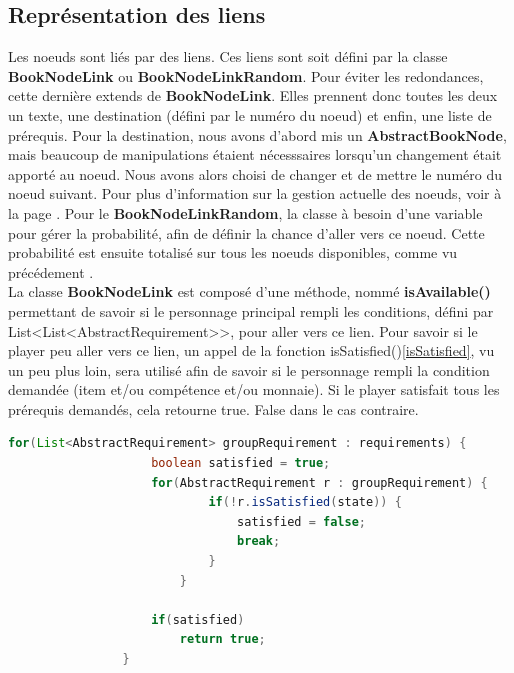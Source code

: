 		\subsection{Représentation des liens}
			Les noeuds sont liés par des liens. Ces liens sont soit défini par la classe \textbf{BookNodeLink} ou \textbf{BookNodeLinkRandom}. Pour éviter les redondances, cette dernière extends de \textbf{BookNodeLink}. Elles prennent donc toutes les deux un texte, une destination (défini par le numéro du noeud) et enfin, une liste de prérequis.  Pour la destination, nous avons d'abord mis un \textbf{AbstractBookNode}, mais beaucoup de manipulations étaient nécesssaires lorsqu'un changement était apporté au noeud. Nous avons alors choisi de changer et de mettre le numéro du noeud suivant. Pour plus d'information sur la gestion actuelle des noeuds, voir  à la page \pageref{book}.
			Pour le \textbf{BookNodeLinkRandom}, la classe à besoin d'une variable pour gérer la probabilité, afin de définir la chance d'aller vers ce noeud. Cette probabilité est ensuite totalisé sur tous les noeuds disponibles, comme vu précédement .\\
			La classe \textbf{BookNodeLink} est composé d'une méthode, nommé \textbf{isAvailable()} permettant de savoir si le personnage principal rempli les conditions, défini par List<List<AbstractRequirement>>, pour aller vers ce lien. Pour savoir si le player peu aller vers ce lien, un appel de la fonction isSatisfied()\ref{isSatisfied}, vu un peu plus loin, sera utilisé afin de savoir si le personnage rempli la condition demandée (item et/ou compétence et/ou monnaie). Si le player satisfait tous les prérequis demandés, cela retourne true. False dans le cas contraire.

			\begin{lstlisting}[gobble=12, language=java, caption=exemple de isAvailable(), label=isAvailable]
				for(List<AbstractRequirement> groupRequirement : requirements) {
					boolean satisfied = true;
					for(AbstractRequirement r : groupRequirement) {
							if(!r.isSatisfied(state)) {
								satisfied = false;
								break;
							}
						}

					if(satisfied)
						return true;
				}
			\end{lstlisting}


